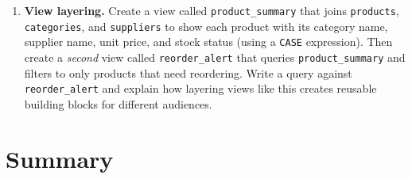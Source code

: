 \documentclass[
  letterpaper,
  DIV=11,
  numbers=noendperiod]{scrreprt}
\newenvironment{Shaded}{\begin{snugshade}}{\end{snugshade}}
\newcommand{\DataTypeTok}[1]{\textcolor[rgb]{0.68,0.00,0.00}{#1}}
\newcommand{\DecValTok}[1]{\textcolor[rgb]{0.68,0.00,0.00}{#1}}
\newcommand{\KeywordTok}[1]{\textcolor[rgb]{0.00,0.23,0.31}{\textbf{#1}}}
\newcommand{\NormalTok}[1]{\textcolor[rgb]{0.00,0.23,0.31}{#1}}
\begin{document}
\begin{enumerate}
  \begin{codelisting}

  \caption{\texttt{duckdb}}

\begin{Shaded}
\begin{Highlighting}[]
\KeywordTok{CREATE} \KeywordTok{TABLE}\NormalTok{ maintenance\_log (}
\NormalTok{    log\_id }\DataTypeTok{INTEGER}\NormalTok{,}
\NormalTok{    machine\_name }\DataTypeTok{VARCHAR}\NormalTok{,}
\NormalTok{    machine\_building }\DataTypeTok{VARCHAR}\NormalTok{,}
\NormalTok{    technician\_name }\DataTypeTok{VARCHAR}\NormalTok{,}
\NormalTok{    technician\_phone }\DataTypeTok{VARCHAR}\NormalTok{,}
\NormalTok{    repair\_date }\DataTypeTok{DATE}\NormalTok{,}
\NormalTok{    repair\_type }\DataTypeTok{VARCHAR}\NormalTok{,}
\NormalTok{    parts\_used }\DataTypeTok{VARCHAR}\NormalTok{,}
    \KeywordTok{cost} \DataTypeTok{DECIMAL}\NormalTok{(}\DecValTok{10}\NormalTok{, }\DecValTok{2}\NormalTok{)}
\NormalTok{);}
\end{Highlighting}
\end{Shaded}

  \end{codelisting}

  (Hints: think about redundancy, constraints, normalization, and what
  happens when a technician changes their phone number.)
\item
  \textbf{View layering.} Create a view called \texttt{product\_summary}
  that joins \texttt{products}, \texttt{categories}, and
  \texttt{suppliers} to show each product with its category name,
  supplier name, unit price, and stock status (using a \texttt{CASE}
  expression). Then create a \emph{second} view called
  \texttt{reorder\_alert} that queries \texttt{product\_summary} and
  filters to only products that need reordering. Write a query against
  \texttt{reorder\_alert} and explain how layering views like this
  creates reusable building blocks for different audiences.
\end{enumerate}

\section{Summary}\label{summary-9}
\end{document}
